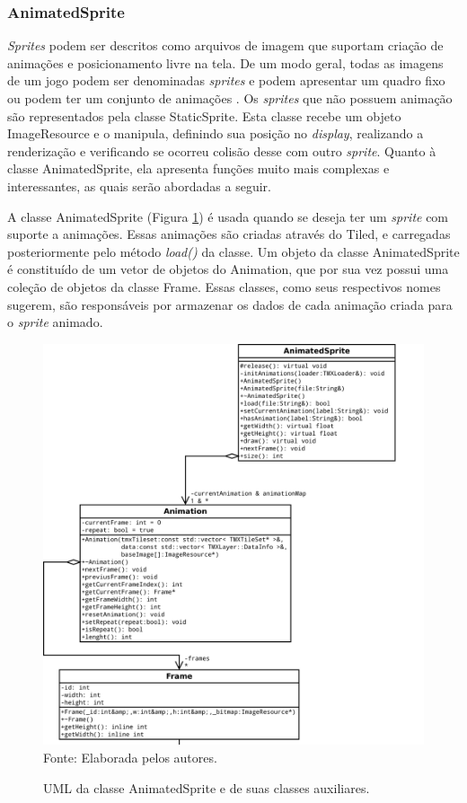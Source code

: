 \subsubsection{AnimatedSprite}
%
%
\textit{Sprites} podem ser descritos como arquivos de imagem que suportam criação de animações e posicionamento livre na tela. De um modo geral, todas as imagens de um jogo podem ser denominadas \textit{sprites} e podem apresentar um quadro fixo ou podem ter um conjunto de animações \cite{Novatec}. Os \textit{sprites} que não possuem animação são representados pela classe StaticSprite. Esta classe recebe um objeto ImageResource e o manipula, definindo sua posição no \textit{display}, realizando a renderização e verificando se ocorreu colisão desse com outro \textit{sprite}. Quanto à classe AnimatedSprite, ela apresenta funções muito mais complexas e interessantes, as quais serão abordadas a seguir.
\par 
A classe AnimatedSprite (Figura \ref{AnimatedSprite}) é usada quando se deseja ter um \textit{sprite} com suporte a animações. Essas animações são criadas através do Tiled, e carregadas posteriormente pelo método \textit{load()} da classe. Um objeto da classe AnimatedSprite é constituído de um vetor de objetos do Animation, que por sua vez possui uma coleção de objetos da classe Frame. Essas classes, como seus respectivos nomes sugerem, são responsáveis por armazenar os dados de cada animação criada para o \textit{sprite} animado.
%
%
%
\begin{figure}[H]
    \centering
    \caption{UML da classe AnimatedSprite e de suas classes auxiliares.}
    \label{AnimatedSprite}
    \includegraphics[scale = 0.40]{uml/AnimatedSprite.png}
    \\Fonte: Elaborada pelos autores.
\end{figure}
